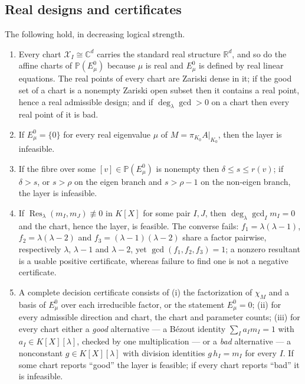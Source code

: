 \subsection{Real designs and certificates}
\label{sec4:real}\label{sec4:certificates}

\begin{prop}
\label{sec4:prop:realpoints}
\label{sec4:prop:sieve}
\label{sec4:prop:dimineq}
\label{sec4:prop:resultant}
\label{sec4:prop:cert}
The following hold, in decreasing logical strength.
\begin{enumerate}[label=(\alph*),leftmargin=*]
\item \label{it:real} Every chart $\mathcal X_I\cong\mathbb C^d$ carries the standard real structure
$\mathbb R^d$, and so do the affine charts of $\mathbb P(E_\mu^0)$ because $\mu$ is real and $E_\mu^0$
is defined by real linear equations. The real points of every chart are Zariski dense in it; if the
good set of a chart is a nonempty Zariski open subset then it contains a real point, hence a real
admissible design; and if $\deg_\lambda\gcd>0$ on a chart then every real point of it is bad.
\item \label{it:sieve} If $E_\mu^0=\{0\}$ for every real eigenvalue $\mu$ of
$M=\pi_{K_0}A|_{K_0}$, then the layer is infeasible.
\item \label{it:dimineq} If the fibre over some $[v]\in\mathbb P(E_\mu^0)$ is nonempty then
$\delta\le s\le r(v)$; if $\delta>s$, or $s>\rho$ on the eigen branch and $s>\rho-1$ on the non-eigen
branch, the layer is infeasible.
\item \label{it:resultant} If $\operatorname{Res}_\lambda(m_I,m_J)\not\equiv0$ in $K[X]$ for some pair
$I,J$, then $\deg_\lambda\gcd_I m_I=0$ and the chart, hence the layer, is feasible. The converse fails:
$f_1=\lambda(\lambda-1)$, $f_2=\lambda(\lambda-2)$ and $f_3=(\lambda-1)(\lambda-2)$ share a factor
pairwise, respectively $\lambda$, $\lambda-1$ and $\lambda-2$, yet $\gcd(f_1,f_2,f_3)=1$; a nonzero
resultant is a usable positive certificate, whereas failure to find one is not a negative certificate.
\item \label{it:cert} A complete decision certificate consists of (i) the factorization of $\chi_M$ and
a basis of $E_\mu^0$ over each irreducible factor, or the statement $E_\mu^0=0$; (ii) for every
admissible direction and chart, the chart and parameter counts; (iii) for every chart either a
\emph{good} alternative --- a Bézout identity $\sum_I a_I m_I=1$ with $a_I\in K[X][\lambda]$, checked
by one multiplication --- or a \emph{bad} alternative --- a nonconstant $g\in K[X][\lambda]$ with
division identities $g\,h_I=m_I$ for every $I$. If some chart reports ``good'' the layer is feasible;
if every chart reports ``bad'' it is infeasible.
\end{enumerate}
\end{prop}

